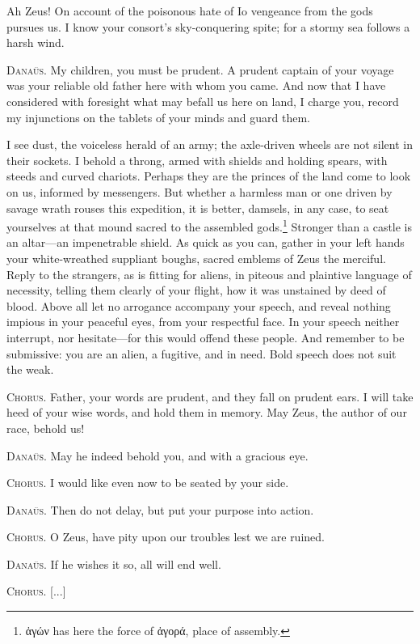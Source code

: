 \documentclass[12pt]{article}
\begin{document}
Ah Zeus! On account of the poisonous hate of Io vengeance from the gods pursues us. I know your consort's sky-conquering spite; for a stormy sea follows a harsh wind.

\textsc{Dana\"{u}s.} My children, you must be prudent. A prudent captain of your voyage was your reliable old father here with whom you came. And now that I have considered with foresight what may befall us here on land, I charge you, record my injunctions on the tablets of your minds and guard them.

I see dust, the voiceless herald of an army; the axle-driven wheels are not silent in their sockets. I behold a throng, armed with shields and holding spears, with steeds and curved chariots. Perhaps they are the princes of the land come to look on us, informed by messengers. But whether a harmless man or one driven by savage wrath rouses this expedition, it is better, damsels, in any case, to seat yourselves at that mound sacred to the assembled gods.\footnote{ἀγών has here the force of ἀγορά, place of assembly.} Stronger than a castle is an altar---an impenetrable shield. As quick as you can, gather in your left hands your white-wreathed suppliant boughs, sacred emblems of Zeus the merciful. Reply to the strangers, as is fitting for aliens, in piteous and plaintive language of necessity, telling them clearly of your flight, how it was unstained by deed of blood. Above all let no arrogance accompany your speech, and reveal nothing impious in your peaceful eyes, from your respectful face. In your speech neither interrupt, nor hesitate---for this would offend these people. And remember to be submissive: you are an alien, a fugitive, and in need. Bold speech does not suit the weak.

\textsc{Chorus.} Father, your words are prudent, and they fall on prudent ears. I will take heed of your wise words, and hold them in memory. May Zeus, the author of our race, behold us!

\textsc{Dana\"{u}s.} May he indeed behold you, and with a gracious eye.

\textsc{Chorus.} I would like even now to be seated by your side.

\textsc{Dana\"{u}s.} Then do not delay, but put your purpose into action.

\textsc{Chorus.} O Zeus, have pity upon our troubles lest we are ruined.

\textsc{Dana\"{u}s.} If he wishes it so, all will end well.

\textsc{Chorus.} [...]
\end{document}

